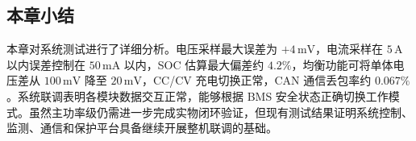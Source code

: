 \subsection{本章小结}

本章对系统测试进行了详细分析。电压采样最大误差为 $+4\,\mathrm{mV}$，电流采样在 $5\,\mathrm{A}$ 以内误差控制在 $50\,\mathrm{mA}$ 以内，SOC 估算最大偏差约 $4.2\%$，均衡功能可将单体电压差从 $100\,\mathrm{mV}$ 降至 $20\,\mathrm{mV}$，CC/CV 充电切换正常，CAN 通信丢包率约 $0.067\%$。系统联调表明各模块数据交互正常，能够根据 BMS 安全状态正确切换工作模式。虽然主功率级仍需进一步完成实物闭环验证，但现有测试结果证明系统控制、监测、通信和保护平台具备继续开展整机联调的基础。
